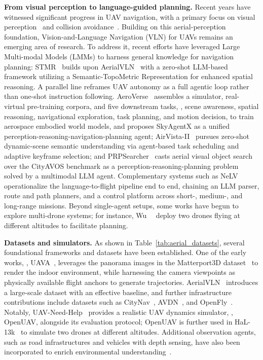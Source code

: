 \textbf{From visual perception to language-guided planning.} Recent years have witnessed significant progress in UAV navigation, with a primary focus on visual perception~\cite{loquercio2018dronet,kang2019generalization,giusti2015machine,smolyanskiy2017toward,fan2020learn,bozcan2020air,majdik2017zurich} and collision avoidance~\cite{xu2025navrl,singla2019memory}. Building on this aerial-perception foundation, Vision-and-Language Navigation (VLN) for UAVs remains an emerging area of research. To address it, recent efforts have leveraged Large Multi-modal Models (LMMs) to harness general knowledge for navigation planning: STMR~\cite{gao2024aerial} builds upon AerialVLN~\cite{liu2023aerialvln} with a zero-shot LLM-based framework utilizing a Semantic-TopoMetric Representation for enhanced spatial reasoning. A parallel line reframes UAV autonomy as a full agentic loop rather than one-shot instruction following. AeroVerse~\cite{yao2024aeroverse} assembles a simulator, real-virtual pre-training corpora, and five downstream tasks, \ie, scene awareness, spatial reasoning, navigational exploration, task planning, and motion decision, to train aerospace embodied world models, and proposes SkyAgentX as a unified perception-reasoning-navigation-planning agent; AirVista-II~\cite{lin2025airvista} pursues zero-shot dynamic-scene semantic understanding via agent-based task scheduling and adaptive keyframe selection; and PRPSearcher~\cite{ji2025uavsearch} casts aerial visual object search over the CityAVOS benchmark as a perception-reasoning-planning problem solved by a multimodal LLM agent. Complementary systems such as NeLV~\cite{yuan2025nelv} operationalize the language-to-flight pipeline end to end, chaining an LLM parser, route and path planners, and a control platform across short-, medium-, and long-range missions. Beyond single-agent setups, some works have begun to explore multi-drone systems; for instance, Wu~\etal~\cite{wu2025aeroduo} deploy two drones flying at different altitudes to facilitate planning.

\textbf{Datasets and simulators.} As shown in Table~\ref{tab:aerial_datasets}, several foundational frameworks and datasets have been established. One of the early works, \ie, UAVA~\cite{albanis2020dronepose}, leverages the panorama images in the Matterport3D dataset~\cite{chang2017matterport3d} to render the indoor environment, while harnessing the camera viewpoints as physically available flight anchors to generate trajectories. AerialVLN~\cite{liu2023aerialvln} introduces a large-scale dataset with an effective baseline, and further infrastructure contributions include datasets such as CityNav~\cite{lee2024citynav}, AVDN~\cite{fan2022aerial}, and OpenFly~\cite{gao2025openfly}. Notably, UAV-Need-Help~\cite{wang2024towards} provides a realistic UAV dynamics simulator, \ie, OpenUAV, alongside its evaluation protocol; OpenUAV is further used in HaL-13k~\cite{wu2025aeroduo} to simulate two drones at different altitudes. Additional observation agents, such as road infrastructures and vehicles with depth sensing, have also been incorporated to enrich environmental understanding~\cite{gao2025airv2x}.

